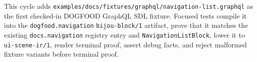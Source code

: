 This cycle adds \texttt{e\allowbreak{}x\allowbreak{}a\allowbreak{}m\allowbreak{}p\allowbreak{}l\allowbreak{}e\allowbreak{}s\allowbreak{}/\allowbreak{}d\allowbreak{}o\allowbreak{}c\allowbreak{}s\allowbreak{}/\allowbreak{}f\allowbreak{}i\allowbreak{}x\allowbreak{}t\allowbreak{}u\allowbreak{}r\allowbreak{}e\allowbreak{}s\allowbreak{}/\allowbreak{}g\allowbreak{}r\allowbreak{}a\allowbreak{}p\allowbreak{}h\allowbreak{}q\allowbreak{}l\allowbreak{}/\allowbreak{}n\allowbreak{}a\allowbreak{}v\allowbreak{}i\allowbreak{}g\allowbreak{}a\allowbreak{}t\allowbreak{}i\allowbreak{}o\allowbreak{}n\allowbreak{}-\allowbreak{}l\allowbreak{}i\allowbreak{}s\allowbreak{}t\allowbreak{}.\allowbreak{}g\allowbreak{}r\allowbreak{}a\allowbreak{}p\allowbreak{}h\allowbreak{}q\allowbreak{}l} as the first checked-in DOGFOOD GraphQL SDL fixture. Focused tests compile it into the \texttt{d\allowbreak{}o\allowbreak{}g\allowbreak{}f\allowbreak{}o\allowbreak{}o\allowbreak{}d\allowbreak{}.\allowbreak{}n\allowbreak{}a\allowbreak{}v\allowbreak{}i\allowbreak{}g\allowbreak{}a\allowbreak{}t\allowbreak{}i\allowbreak{}o\allowbreak{}n} \texttt{b\allowbreak{}i\allowbreak{}j\allowbreak{}o\allowbreak{}u\allowbreak{}-\allowbreak{}b\allowbreak{}l\allowbreak{}o\allowbreak{}c\allowbreak{}k\allowbreak{}/\allowbreak{}1} artifact, prove that it matches the existing \texttt{d\allowbreak{}o\allowbreak{}c\allowbreak{}s\allowbreak{}.\allowbreak{}n\allowbreak{}a\allowbreak{}v\allowbreak{}i\allowbreak{}g\allowbreak{}a\allowbreak{}t\allowbreak{}i\allowbreak{}o\allowbreak{}n} registry entry and \texttt{N\allowbreak{}a\allowbreak{}v\allowbreak{}i\allowbreak{}g\allowbreak{}a\allowbreak{}t\allowbreak{}i\allowbreak{}o\allowbreak{}n\allowbreak{}L\allowbreak{}i\allowbreak{}s\allowbreak{}t\allowbreak{}B\allowbreak{}l\allowbreak{}o\allowbreak{}c\allowbreak{}k}, lower it to \texttt{u\allowbreak{}i\allowbreak{}-\allowbreak{}s\allowbreak{}c\allowbreak{}e\allowbreak{}n\allowbreak{}e\allowbreak{}-\allowbreak{}i\allowbreak{}r\allowbreak{}/\allowbreak{}1}, render terminal proof, assert debug facts, and reject malformed fixture variants before terminal proof.


